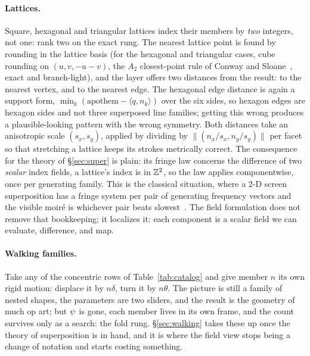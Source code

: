 \paragraph{Lattices.} Square, hexagonal and triangular lattices index their
members by \emph{two} integers, not one: rank two on the exact rung. The
nearest lattice point is found by
rounding in the lattice basis (for the hexagonal and triangular cases, cube
rounding on $(u,v,-u-v)$, the $A_2$ closest-point rule of Conway and
Sloane~\cite{Conway1982Fast}, exact and branch-light), and the layer offers
two distances from the result: to the nearest vertex, and to the nearest edge. The
hexagonal edge distance is again a support form, $\min_k(\mathrm{apothem}-\langle
q,n_k\rangle)$ over the six sides, so hexagon edges are hexagon sides and not
three superposed line families; getting this wrong produces a plausible-looking
pattern with the wrong symmetry. Both distances take an anisotropic scale
$(s_x,s_y)$, applied by dividing by $\lVert(n_x/s_x,n_y/s_y)\rVert$ per facet so
that stretching a lattice keeps its strokes metrically correct.
The consequence for the theory of \S\ref{sec:super} is plain: its fringe law
concerns the difference of two \emph{scalar} index fields, a lattice's index
is in $\mathbb{Z}^2$, so the law applies componentwise, once per generating family.
This is the classical situation, where a $2$-D screen superposition has a
fringe system per pair of generating frequency vectors and the visible
moir\'e is whichever pair beats
slowest~\cite{Amidror2009Theory, Amidror1998Fourier}. The field formulation
does not remove that bookkeeping; it localizes it: each component is a scalar
field we can evaluate, difference, and map.

\paragraph{Walking families.} Take any of the concentric rows of
Table~\ref{tab:catalog} and give member $n$ its own rigid motion: displace it
by $n\delta$, turn it by $n\theta$. The picture is still a family of nested
shapes, the parameters are two sliders, and the result is the geometry of
much op art; but $\psi$ is gone, each member lives in its own frame, and the
count survives only as a search: the fold rung. \S\ref{sec:walking} takes
these up once the theory of superposition is in hand, and it is where the
field view stops being a change of notation and starts costing something.

